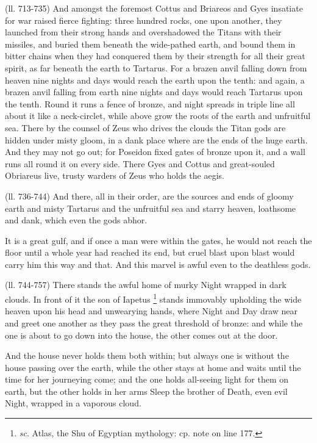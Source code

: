 (ll. 713-735) And amongst the foremost Cottus and Briareos and Gyes insatiate
for war raised fierce fighting: three hundred rocks, one upon another, they
launched from their strong hands and overshadowed the Titans with their
missiles, and buried them beneath the wide-pathed earth, and bound them in
bitter chains when they had conquered them by their strength for all their
great spirit, as far beneath the earth to Tartarus. For a brazen anvil falling
down from heaven nine nights and days would reach the earth upon the tenth: and
again, a brazen anvil falling from earth nine nights and days would reach
Tartarus upon the tenth. Round it runs a fence of bronze, and night spreads in
triple line all about it like a neck-circlet, while above grow the roots of the
earth and unfruitful sea. There by the counsel of Zeus who drives the clouds
the Titan gods are hidden under misty gloom, in a dank place where are the ends
of the huge earth. And they may not go out; for Poseidon fixed gates of bronze
upon it, and a wall runs all round it on every side. There Gyes and Cottus and
great-souled Obriareus live, trusty warders of Zeus who holds the aegis.

(ll. 736-744) And there, all in their order, are the sources and ends of gloomy
earth and misty Tartarus and the unfruitful sea and starry heaven, loathsome
and dank, which even the gods abhor.

It is a great gulf, and if once a man were within the gates, he would not reach
the floor until a whole year had reached its end, but cruel blast upon blast
would carry him this way and that. And this marvel is awful even to the
deathless gods.

(ll. 744-757) There stands the awful home of murky Night wrapped in dark
clouds. In front of it the son of Iapetus \footnote{\emph{sc}. Atlas, the Shu
of Egyptian mythology: cp. note on line 177.} stands
immovably upholding the wide heaven upon his head and unwearying hands, where
Night and Day draw near and greet one another as they pass the great threshold
of bronze: and while the one is about to go down into the house, the other
comes out at the door.

And the house never holds them both within; but always one is without the house
passing over the earth, while the other stays at home and waits until the time
for her journeying come; and the one holds all-seeing light for them on earth,
but the other holds in her arms Sleep the brother of Death, even evil Night,
wrapped in a vaporous cloud.

